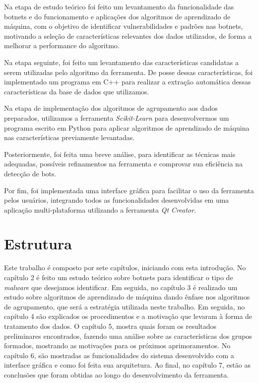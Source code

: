 Na etapa de estudo teórico foi feito um levantamento da funcionalidade das botnets e do funcionamento e aplicações dos algoritmos de aprendizado de máquina, com o objetivo de identificar vulnerabilidades e padrões nas botnets, motivando a seleção de características relevantes dos dados utilizados, de forma a melhorar a performance do algoritmo.

Na etapa seguinte, foi feito um levantamento das características candidatas a serem utilizadas pelo algoritmo da ferramenta. De posse dessas características, foi implementado um programa em C++ para realizar a extração automática dessas características da base de dados que utilizamos.

Na etapa de implementação dos algoritmos de agrupamento aos dados preparados, utilizamos a ferramenta \textit{Scikit-Learn} para desenvolvermos um programa escrito em Python para aplicar algoritmos de aprendizado de máquina nas características previamente levantadas.

Posteriormente, foi feita uma breve análise, para identificar as técnicas mais adequadas, possíveis refinamentos na ferramenta e comprovar sua eficiência na detecção de bots.

Por fim, foi implementada uma interface gráfica para facilitar o uso da ferramenta pelos usuários, integrando todos as funcionalidades desenvolvidas em uma aplicação multi-plataforma utilizando a ferramenta \textit{Qt Creator}.

\section{Estrutura}
Este trabalho é composto por sete capítulos, iniciando com esta introdução. No capítulo 2 é feito um estudo teórico sobre botnets para identificar o tipo de \textit{malware} que desejamos identificar. Em seguida, no capítulo 3 é realizado um estudo sobre algoritmos de aprendizado de máquina dando ênfase nos algoritmos de agrupamento, que será a estratégia utilizada neste trabalho. Em seguida, no capítulo 4 são explicados os procedimentos e a motivação que levaram à forma de tratamento dos dados. O capítulo 5, mostra quais foram os resultados preliminares encontrados, fazendo uma análise sobre as características dos grupos formados, mostrando as motivações para os próximos aprimoramentos. No capítulo 6, são mostradas as funcionalidades do sistema desenvolvido com a interface gráfica e como foi feita sua arquitetura. Ao final, no capítulo 7, estão as conclusões que foram obtidas ao longo do desenvolvimento da ferramenta.